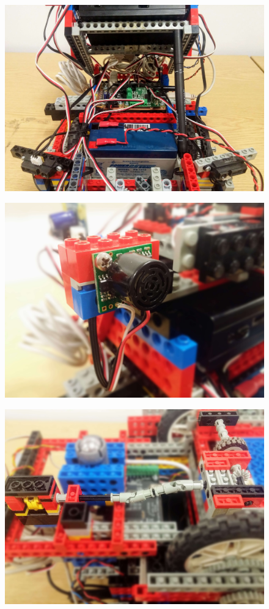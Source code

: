 \begin{figure}[ht]
    \centering
    \includegraphics[width=0.7\linewidth]{res/robot-pics/top-off.jpg}
    \caption{}
    \label{fig:}
\end{figure}

\begin{figure}[ht]
    \centering
    \includegraphics[width=0.7\linewidth]{res/robot-pics/sonar-placement.jpg}
    \caption{}
    \label{fig:}
\end{figure}

\begin{figure}[ht]
    \centering
    \includegraphics[width=0.7\linewidth]{res/robot-pics/pivot-wheel-sensor.jpg}
    \caption{}
    \label{fig:}
\end{figure}


